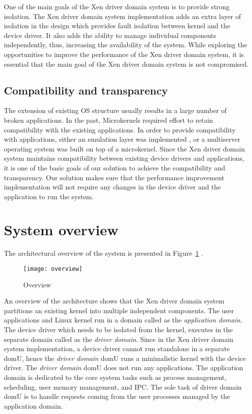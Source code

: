 One of the main goals of the Xen driver domain system is to provide strong isolation. The Xen driver domain system implementation adds an extra layer of isolation in the design which provides fault isolation between kernel and the device driver. It also adds the ability to manage individual components independently, thus, increasing the availability of the system. While exploring the opportunities to improve the performance of the Xen driver domain system, it is essential that the main goal of the Xen driver domain system is not compromised.

\subsection{Compatibility and transparency} 
\label{subsec:compatibility}
The extension of existing OS structure usually results in a large number of broken applications. In the past, Microkernels required effort to retain compatibility with the existing applications\cite{Heiser06arevirtualmachine}. In order to provide compatibility with applications, either an emulation layer was implemented \cite{Heiser06arevirtualmachine}, or a multiserver operating system \cite{Gefflaut00thesawmill,Tanenbaum06canwe} was built on top of a microkernel. Since the Xen driver domain system maintains compatibility between existing device drivers and applications, it is one of the basic goals of our solution to achieve the compatibility and transparency. Our solution makes sure that the performance improvement implementation will not require any changes in the device driver and the application to run the system.

\pagebreak

\section{System overview}\label{overview}
The architectural overview of the system is presented in Figure~\ref{fig:overview} .
\begin{figure}[!ht]
\centering
\texttt{[image: overview]}
\caption{Overview}
\label{fig:overview}
\end{figure}
An overview of the architecture shows that the Xen driver domain system partitions an existing kernel into multiple independent components. The user applications and Linux kernel run in a domain called as the \textit{application domain}. The device driver which needs to be isolated from the kernel, executes in the separate domain called as the \textit{driver domain}. Since in the Xen driver domain system implementation, a device driver cannot run standalone in a separate domU, hence the \textit{driver domain} domU runs a minimalistic kernel with the device driver. The \textit{driver domain} domU does not run any applications. The application domain is dedicated to the core system tasks such as process management, scheduling, user memory management, and IPC. The sole task of driver domain domU is to handle requests coming from the user processes managed by the application domain.
\pagebreak


